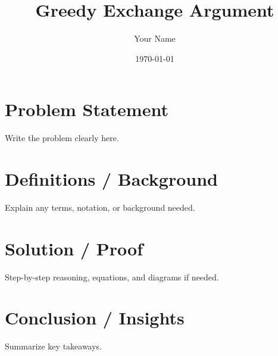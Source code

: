 \documentclass[12pt]{article}
\title{Greedy Exchange Argument}
\author{Your Name}
\date{\today}
\begin{document}
\maketitle

\section*{Problem Statement}
Write the problem clearly here.

\section*{Definitions / Background}
Explain any terms, notation, or background needed.

\section*{Solution / Proof}
Step-by-step reasoning, equations, and diagrams if needed.

\section*{Conclusion / Insights}
Summarize key takeaways.
\end{document}
